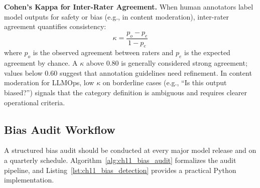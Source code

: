 \textbf{Cohen's Kappa for Inter-Rater Agreement.} When human annotators label model outputs for safety or bias (e.g., in content moderation), inter-rater agreement quantifies consistency:
\begin{equation}\label{eq:ch11_cohens_kappa}
\kappa = \frac{p_o - p_e}{1 - p_e}
\end{equation}
where $p_o$ is the observed agreement between raters and $p_e$ is the expected agreement by chance. A $\kappa$ above 0.80 is generally considered strong agreement; values below 0.60 suggest that annotation guidelines need refinement. In content moderation for LLMOps, low $\kappa$ on borderline cases (e.g., ``Is this output biased?'') signals that the category definition is ambiguous and requires clearer operational criteria.

\subsection{Bias Audit Workflow}\label{sec:ch11_bias_audit}

A structured bias audit should be conducted at every major model release and on a quarterly schedule. Algorithm~\ref{alg:ch11_bias_audit} formalizes the audit pipeline, and Listing~\ref{lst:ch11_bias_detection} provides a practical Python implementation.

